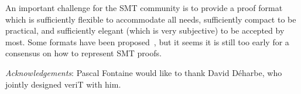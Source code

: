 \documentclass{llncs}
\begin{document}
An important challenge for the SMT community is to provide a proof format which
is sufficiently flexible to accommodate all needs, sufficiently compact to be
practical, and sufficiently elegant (which is very subjective) to be accepted by
most.  Some formats have been proposed~\cite{Besson1,dMB08,Reynolds1}, but it
seems it is still too early for a consensus on how to represent SMT proofs.


\medskip\noindent%
\emph{Acknowledgements}: Pascal Fontaine would like to thank David D\'{e}harbe,
who jointly designed veriT with him.




\end{document}
